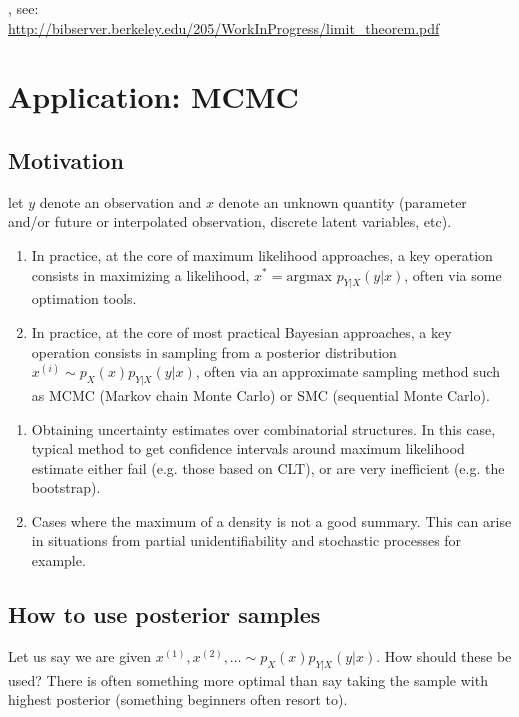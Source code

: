 \documentclass{article}
\begin{document}
, see: \\{\footnotesize \url{http://bibserver.berkeley.edu/205/WorkInProgress/limit_theorem.pdf}}


\section{Application: MCMC}

\subsection{Motivation}

 let $y$ denote an observation and $x$ denote an unknown quantity (parameter and/or future or interpolated observation, discrete latent variables, etc). 

\begin{enumerate}
  \item In practice, at the core of maximum likelihood approaches, a key operation consists in maximizing a likelihood, $x^* = \text{argmax } p_{Y|X}(y|x)$, often via some optimation tools.
  \item In practice, at the core of most practical Bayesian approaches, a key operation consists in sampling from a posterior distribution $x^{(i)} \sim p_X(x) p_{Y|X}(y|x)$, often via an approximate sampling method such as MCMC (Markov chain Monte Carlo) or SMC (sequential Monte Carlo).
\end{enumerate}

\begin{enumerate}
  \item Obtaining uncertainty estimates over combinatorial structures. In this case, typical method to get confidence intervals around maximum likelihood estimate either fail (e.g. those based on CLT), or are very inefficient (e.g. the bootstrap).
  \item Cases where the maximum of a density is not a good summary. This can arise in situations from partial unidentifiability and stochastic processes for example.
\end{enumerate}


\subsection{How to use posterior samples}

Let us say we are given $x^{(1)}, x^{(2)}, \dots \sim p_X(x) p_{Y|X}(y|x)$. How should these be used? There is often something more optimal than say taking the sample with highest posterior (something beginners often resort to). 
\end{document}
